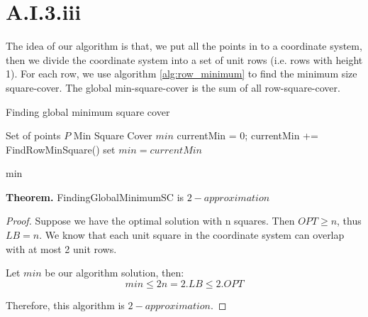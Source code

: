 \section*{A.I.3.iii}
\label{a-1-3-3}

The idea of our algorithm is that, we put all the points in to a coordinate system, then we divide the coordinate system into a set of unit rows (i.e. rows with height 1). For each row, we use algorithm \ref{alg:row_minimum} to find the minimum size square-cover. The global min-square-cover is the sum of all row-square-cover.

\begin{algorithm}
  \caption{Finding global minimum square cover}
  \label{alg:global_minimum}
  \begin{algorithmic}
    \renewcommand{\algorithmicrequire}{\textbf{Input:}}
    \renewcommand{\algorithmicensure}{\textbf{Output:}}
    \algnewcommand{}
    \algnewcommand\Operation{\item[\algorithmicoperation]}
    \Require Set of points $P$
    \Ensure Min Square Cover $min$
    \Operation
    \State currentMin = 0;
    \State currentMin += FindRowMinSquare()
    \EndFor
    \State set $min = currentMin$
    
    \Return min
  \end{algorithmic}
\end{algorithm}

\textbf{Theorem.} FindingGlobalMinimumSC is $2-approximation$

\begin{proof}
  Suppose we have the optimal solution with n squares. Then $OPT \geq n$, thus $LB = n$.
  We know that each unit square in the coordinate system can overlap with at most 2 unit rows.

  Let $min$ be our algorithm solution, then:
  \begin {equation}
    min \leq 2n = 2.LB \leq 2.OPT
  \end {equation}

  Therefore, this algorithm is $2-approximation$.

\end{proof}
